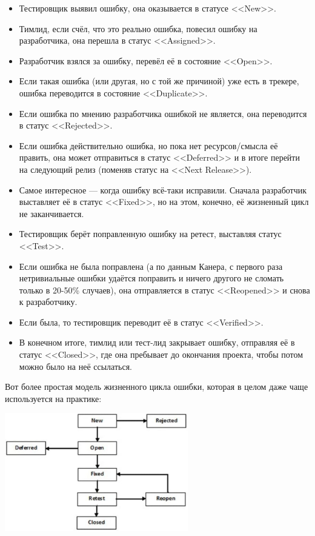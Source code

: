 \documentclass{../../text-style}
\begin{document}
\begin{itemize}
    \item Тестировщик выявил ошибку, она оказывается в статусе <<New>>.
    \item Тимлид, если счёл, что это реально ошибка, повесил ошибку на разработчика, она перешла в статус <<Assigned>>.
    \item Разработчик взялся за ошибку, перевёл её в состояние <<Open>>.
    \item Если такая ошибка (или другая, но с той же причиной) уже есть в трекере, ошибка переводится в состояние <<Duplicate>>.
    \item Если ошибка по мнению разработчика ошибкой не является, она переводится в статус <<Rejected>>.
    \item Если ошибка действительно ошибка, но пока нет ресурсов/смысла её править, она может отправиться в статус <<Deferred>> и в итоге перейти на следующий релиз (поменяв статус на <<Next Release>>).
    \item Самое интересное --- когда ошибку всё-таки исправили. Сначала разработчик выставляет её в статус <<Fixed>>, но на этом, конечно, её жизненный цикл не заканчивается.
    \item Тестировщик берёт поправленную ошибку на ретест, выставляя статус <<Test>>.
    \item Если ошибка не была поправлена (а по данным Канера, с первого раза нетривиальные ошибки удаётся поправить и ничего другого не сломать только в 20-50\% случаев), она отправляется в статус <<Reopened>> и снова к разработчику.
    \item Если была, то тестировщик переводит её в статус <<Verified>>.
    \item В конечном итоге, тимлид или тест-лид закрывает ошибку, отправляя её в статус <<Closed>>, где она пребывает до окончания проекта, чтобы потом можно было на неё ссылаться.
\end{itemize}

Вот более простая модель жизненного цикла ошибки, которая в целом даже чаще используется на практике:

\begin{center}
    \includegraphics[width=0.6\textwidth]{bugLifecycle2.png}
\end{center}
\end{document}

